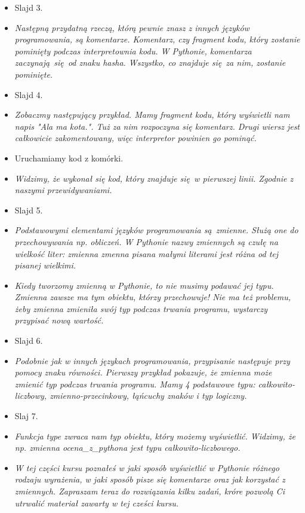 \documentclass{mwart}
\begin{document}
\begin{itemize}
  \item Slajd 3.
  \item \emph{Następną przydatną rzeczą, którą pewnie znasz z innych języków
      programowania, są komentarze. Komentarz, czy fragment kodu, który zostanie
      pominięty podczas interpretownia kodu. W Pythonie, komentarza zaczynają się od
      znaku hasha. Wszystko, co znajduje się za nim, zostanie pominięte.}
  \item Slajd 4.
  \item \emph{Zobaczmy następujący przykład. Mamy fragment kodu, który wyświetli nam
      napis "Ala ma kota.". Tuż za nim rozpoczyna się komentarz. Drugi wiersz jest
      całkowicie zakomentowany, więc interpretor powinien go pominąć.}
  \item Uruchamiamy kod z komórki.
  \item \emph{Widzimy, że wykonał się kod, który znajduje się w pierwszej linii. Zgodnie z
      naszymi przewidywaniami.}
  \item Slajd 5.
  \item \emph{Podstawowymi elementami języków programowania są zmienne. Służą one do
      przechowywania np. obliczeń. W Pythonie nazwy zmiennych są czułę na wielkość
      liter: zmienna zmenna pisana małymi literami jest różna od tej pisanej wielkimi.}
  \item \emph{Kiedy tworzomy zmienną w Pythonie, to nie musimy podawać jej typu. Zmienna
      zawsze ma tym obiektu, którzy przechowuje! Nie ma też problemu, żeby zmienna
      zmieniła swój typ podczas trwania programu, wystarczy przypisać nową wartość.}
  \item Slajd 6.
  \item \emph{Podobnie jak w innych językach programowania, przypisanie następuje przy
      pomocy znaku równości. Pierwszy przykład pokazuje, że zmienna może zmienić typ
      podczas trwania programu. Mamy 4 podstawowe typu: całkowito-liczbowy,
      zmienno-przecinkowy, łąńcuchy znaków i typ logiczny.}
  \item Slaj 7.
  \item \emph{Funkcja type zwraca nam typ obiektu, który możemy wyświetlić. Widzimy, że
      np. zmienna ocena\_z\_pythona jest typu całkowito-liczbowego.}
  \item \emph{W tej części kursu poznałeś w jaki sposób wyświetlić w Pythonie różnego
      rodzaju wyrażenia, w jaki sposób pisze się komentarze oraz jak korzystać z
      zmiennych. Zapraszam teraz do rozwiązania kilku zadań, króre pozwolą Ci utrwalić
      materiał zawarty w tej cześci kursu.}
\end{itemize}
\end{document}

